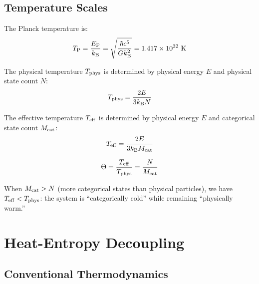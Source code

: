 \subsection{Temperature Scales}

\begin{definition}
The Planck temperature is:
\begin{equation}
T_{\mathrm{P}} = \frac{E_{\mathrm{P}}}{k_{\mathrm{B}}} = \sqrt{\frac{\hbar c^5}{G k_{\mathrm{B}}^2}} = 1.417 \times 10^{32} \text{ K}
\end{equation}
\end{definition}

\begin{definition}
The physical temperature $T_{\mathrm{phys}}$ is determined by physical energy $E$ and physical state count $N$:
\begin{equation}
T_{\mathrm{phys}} = \frac{2E}{3k_{\mathrm{B}} N}
\end{equation}
\end{definition}

\begin{definition}
The effective temperature $T_{\mathrm{eff}}$ is determined by physical energy $E$ and categorical state count $M_{\mathrm{cat}}$:
\begin{equation}
T_{\mathrm{eff}} = \frac{2E}{3k_{\mathrm{B}} M_{\mathrm{cat}}}
\end{equation}
\end{definition}

\begin{definition}
\begin{equation}
\Theta = \frac{T_{\mathrm{eff}}}{T_{\mathrm{phys}}} = \frac{N}{M_{\mathrm{cat}}}
\end{equation}
\end{definition}

When $M_{\mathrm{cat}} > N$ (more categorical states than physical particles), we have $T_{\mathrm{eff}} < T_{\mathrm{phys}}$: the system is ``categorically cold'' while remaining ``physically warm.''

\section{Heat-Entropy Decoupling}

\subsection{Conventional Thermodynamics}

